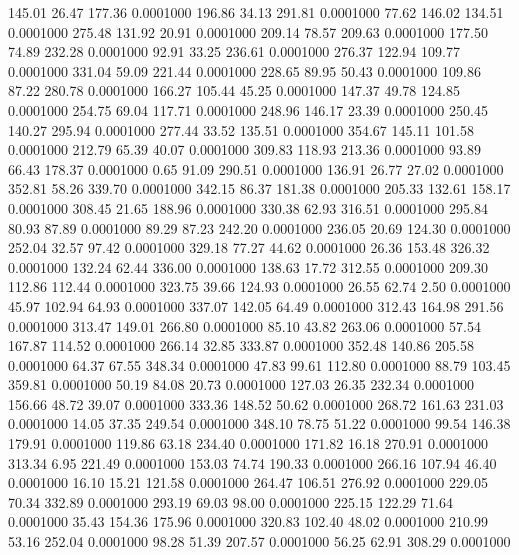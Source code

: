  145.01   26.47  177.36   0.0001000
 196.86   34.13  291.81   0.0001000
  77.62  146.02  134.51   0.0001000
 275.48  131.92   20.91   0.0001000
 209.14   78.57  209.63   0.0001000
 177.50   74.89  232.28   0.0001000
  92.91   33.25  236.61   0.0001000
 276.37  122.94  109.77   0.0001000
 331.04   59.09  221.44   0.0001000
 228.65   89.95   50.43   0.0001000
 109.86   87.22  280.78   0.0001000
 166.27  105.44   45.25   0.0001000
 147.37   49.78  124.85   0.0001000
 254.75   69.04  117.71   0.0001000
 248.96  146.17   23.39   0.0001000
 250.45  140.27  295.94   0.0001000
 277.44   33.52  135.51   0.0001000
 354.67  145.11  101.58   0.0001000
 212.79   65.39   40.07   0.0001000
 309.83  118.93  213.36   0.0001000
  93.89   66.43  178.37   0.0001000
   0.65   91.09  290.51   0.0001000
 136.91   26.77   27.02   0.0001000
 352.81   58.26  339.70   0.0001000
 342.15   86.37  181.38   0.0001000
 205.33  132.61  158.17   0.0001000
 308.45   21.65  188.96   0.0001000
 330.38   62.93  316.51   0.0001000
 295.84   80.93   87.89   0.0001000
  89.29   87.23  242.20   0.0001000
 236.05   20.69  124.30   0.0001000
 252.04   32.57   97.42   0.0001000
 329.18   77.27   44.62   0.0001000
  26.36  153.48  326.32   0.0001000
 132.24   62.44  336.00   0.0001000
 138.63   17.72  312.55   0.0001000
 209.30  112.86  112.44   0.0001000
 323.75   39.66  124.93   0.0001000
  26.55   62.74    2.50   0.0001000
  45.97  102.94   64.93   0.0001000
 337.07  142.05   64.49   0.0001000
 312.43  164.98  291.56   0.0001000
 313.47  149.01  266.80   0.0001000
  85.10   43.82  263.06   0.0001000
  57.54  167.87  114.52   0.0001000
 266.14   32.85  333.87   0.0001000
 352.48  140.86  205.58   0.0001000
  64.37   67.55  348.34   0.0001000
  47.83   99.61  112.80   0.0001000
  88.79  103.45  359.81   0.0001000
  50.19   84.08   20.73   0.0001000
 127.03   26.35  232.34   0.0001000
 156.66   48.72   39.07   0.0001000
 333.36  148.52   50.62   0.0001000
 268.72  161.63  231.03   0.0001000
  14.05   37.35  249.54   0.0001000
 348.10   78.75   51.22   0.0001000
  99.54  146.38  179.91   0.0001000
 119.86   63.18  234.40   0.0001000
 171.82   16.18  270.91   0.0001000
 313.34    6.95  221.49   0.0001000
 153.03   74.74  190.33   0.0001000
 266.16  107.94   46.40   0.0001000
  16.10   15.21  121.58   0.0001000
 264.47  106.51  276.92   0.0001000
 229.05   70.34  332.89   0.0001000
 293.19   69.03   98.00   0.0001000
 225.15  122.29   71.64   0.0001000
  35.43  154.36  175.96   0.0001000
 320.83  102.40   48.02   0.0001000
 210.99   53.16  252.04   0.0001000
  98.28   51.39  207.57   0.0001000
  56.25   62.91  308.29   0.0001000
